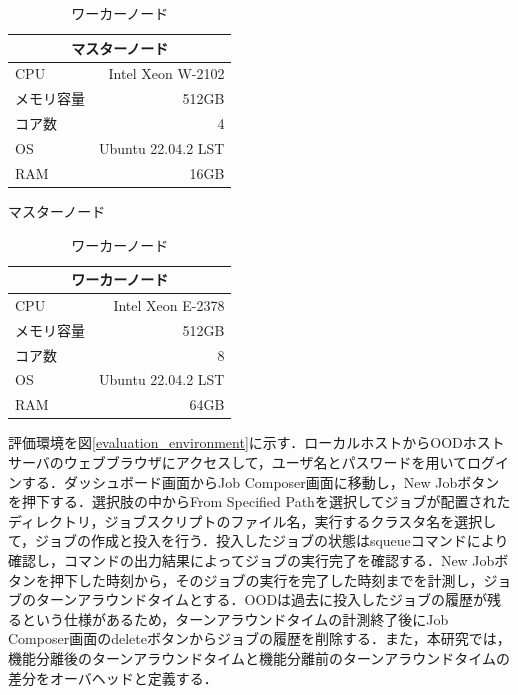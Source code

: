\begin{table}[b]
    \begin{minipage}[c]{0.5\hsize}
        \centering
        \begin{tabular}{lr}
            \multicolumn{2}{c}{マスターノード} \\ \hline
            CPU    & Intel Xeon W-2102  \\
            メモリ容量  & 512GB              \\
            コア数    & 4                  \\
            OS     & Ubuntu 22.04.2 LST \\
            RAM    & 16GB              
        \end{tabular}%
        \caption{マスターノード}
        \label{masternode}
    \end{minipage}%
    \begin{minipage}[c]{0.5\hsize}
        \centering
        \begin{tabular}{lr}
            \multicolumn{2}{c}{ワーカーノード} \\ \hline
            CPU    & Intel Xeon E-2378  \\
            メモリ容量  & 512GB              \\
            コア数    & 8                  \\
            OS     & Ubuntu 22.04.2 LST \\
            RAM    & 64GB              
        \end{tabular}%
        \caption{ワーカーノード}
        \label{workernode}
    \end{minipage}
\end{table}

評価環境を図\ref{evaluation_environment}に示す．ローカルホストからOODホストサーバのウェブブラウザにアクセスして，ユーザ名とパスワードを用いてログインする．ダッシュボード画面からJob Composer画面に移動し，New Jobボタンを押下する．選択肢の中からFrom Specified Pathを選択してジョブが配置されたディレクトリ，ジョブスクリプトのファイル名，実行するクラスタ名を選択して，ジョブの作成と投入を行う．投入したジョブの状態はsqueueコマンドにより確認し，コマンドの出力結果によってジョブの実行完了を確認する．New Jobボタンを押下した時刻から，そのジョブの実行を完了した時刻までを計測し，ジョブのターンアラウンドタイムとする．OODは過去に投入したジョブの履歴が残るという仕様があるため，ターンアラウンドタイムの計測終了後にJob Composer画面のdeleteボタンからジョブの履歴を削除する．また，本研究では，機能分離後のターンアラウンドタイムと機能分離前のターンアラウンドタイムの差分をオーバヘッドと定義する．\par


